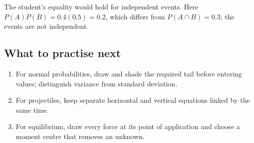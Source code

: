 \documentclass[10pt,a4paper]{article}
\begin{document}
The student's equality would hold for independent events. Here \(P(A)P(B)=0.4(0.5)=0.2\), which differs from \(P(A\cap B)=0.3\); the events are not independent.

\subsection*{What to practise next}\begin{enumerate}
\item For normal probabilities, draw and shade the required tail before entering values; distinguish variance from standard deviation.
\item For projectiles, keep separate horizontal and vertical equations linked by the same time.
\item For equilibrium, draw every force at its point of application and choose a moment centre that removes an unknown.
\end{enumerate}
\end{document}
